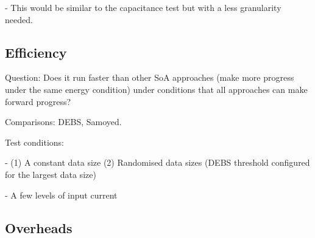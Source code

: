 - This would be similar to the capacitance test but with a less granularity needed.

\subsection{Efficiency}

Question: Does it run faster than other SoA approaches (make more progress under the same energy condition) under conditions that all approaches can make forward progress?

Comparisons: DEBS, Samoyed.

Test conditions:
    
- (1) A constant data size (2) Randomised data sizes (DEBS threshold configured for the largest data size)

- A few levels of input current

\subsection{Overheads}




